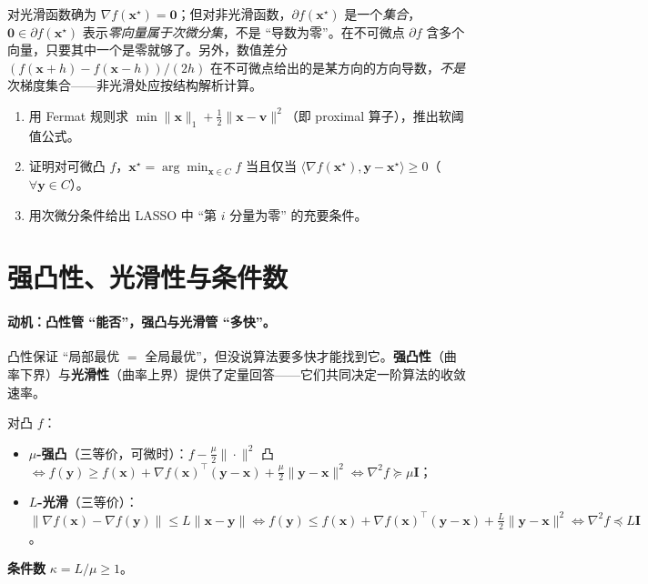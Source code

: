 \begin{pitfall}
对光滑函数确为 $\nabla f(\mathbf x^\star)=\mathbf 0$；但对非光滑函数，$\partial f(\mathbf x^\star)$ 是一个\emph{集合}，$\mathbf 0\in\partial f(\mathbf x^\star)$ 表示\emph{零向量属于次微分集}，不是 “导数为零”。在不可微点 $\partial f$ 含多个向量，只要其中一个是零就够了。另外，数值差分 $(f(\mathbf x+h)-f(\mathbf x-h))/(2h)$ 在不可微点给出的是某方向的方向导数，\emph{不是}次梯度集合——非光滑处应按结构解析计算。
\end{pitfall}

\begin{practice}
\begin{enumerate}
  \item 用 Fermat 规则求 $\min\|\mathbf x\|_1+\tfrac12\|\mathbf x-\mathbf v\|^2$（即 proximal 算子），推出软阈值公式。
  \item 证明对可微凸 $f$，$\mathbf x^\star=\arg\min_{\mathbf x\in C}f$ 当且仅当 $\langle\nabla f(\mathbf x^\star),\mathbf y-\mathbf x^\star\rangle\ge0$（$\forall\mathbf y\in C$）。
  \item 用次微分条件给出 LASSO 中 “第 $i$ 分量为零” 的充要条件。
\end{enumerate}
\end{practice}

\section{强凸性、光滑性与条件数}
\label{sec:cvx-strong}

\paragraph{动机：凸性管 “能否”，强凸与光滑管 “多快”。}
凸性保证 “局部最优 $=$ 全局最优”，但没说算法要多快才能找到它。\textbf{强凸性}（曲率下界）与\textbf{光滑性}（曲率上界）提供了定量回答——它们共同决定一阶算法的收敛速率。

\begin{definition}[$\mu$-强凸与 $L$-光滑]\label{def:strong-smooth}
对凸 $f$：
\begin{itemize}
  \item \textbf{$\mu$-强凸}（三等价，可微时）：$f-\tfrac\mu2\|\cdot\|^2$ 凸 $\iff f(\mathbf y)\ge f(\mathbf x)+\nabla f(\mathbf x)^\top(\mathbf y-\mathbf x)+\tfrac\mu2\|\mathbf y-\mathbf x\|^2\iff\nabla^2 f\succeq\mu\mathbf I$；
  \item \textbf{$L$-光滑}（三等价）：$\|\nabla f(\mathbf x)-\nabla f(\mathbf y)\|\le L\|\mathbf x-\mathbf y\|\iff f(\mathbf y)\le f(\mathbf x)+\nabla f(\mathbf x)^\top(\mathbf y-\mathbf x)+\tfrac L2\|\mathbf y-\mathbf x\|^2\iff\nabla^2 f\preceq L\mathbf I$。
\end{itemize}
\textbf{条件数} $\kappa=L/\mu\ge1$。
\end{definition}

